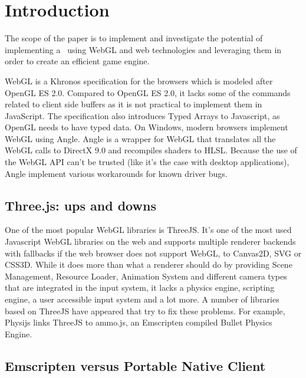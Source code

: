 \chapter{Introduction}
\label{chapter:intro}

The scope of the paper is to implement and investigate the potential of implementing a
\project\ using WebGL and web technologies and leveraging them in order to create an efficient game engine.

WebGL is a Khronos specification for the browsers which is modeled after OpenGL ES
2.0. Compared to OpenGL ES 2.0, it lacks some of the commands related to client side
buffers as it is not practical to implement them in JavaScript. The specification also
introduces Typed Arrays to Javascript, as OpenGL needs to have typed data. On Windows,
modern browsers implement WebGL using Angle. Angle is a wrapper for WebGL that
translates all the WebGL calls to DirectX 9.0 and recompiles shaders to HLSL. Because
the use of the WebGL API can’t be trusted (like it’s the case with desktop applications), Angle implement various workarounds for known driver bugs.



\section{Three.js: ups and downs}
\label{sec: ThreeJs}

One of the most popular WebGL libraries is ThreeJS. It’s one of the most used Javascript WebGL libraries on the web and supports multiple renderer backends with fallbacks if the web browser does not support WebGL, to Canvas2D, SVG or CSS3D. 
While it does more than what a renderer should do by providing Scene Management,
Resource Loader, Animation System and different camera types that are integrated in the
input system, it lacks a physics engine, scripting engine, a user accessible input system and a lot more.
A number of libraries based on ThreeJS have appeared that try to fix these problems. For example, Physijs links ThreeJS to ammo.js, an Emscripten compiled Bullet Physics Engine.


\section{Emscripten versus Portable Native Client}
\label{sec: Emscripten, PNaCl}

